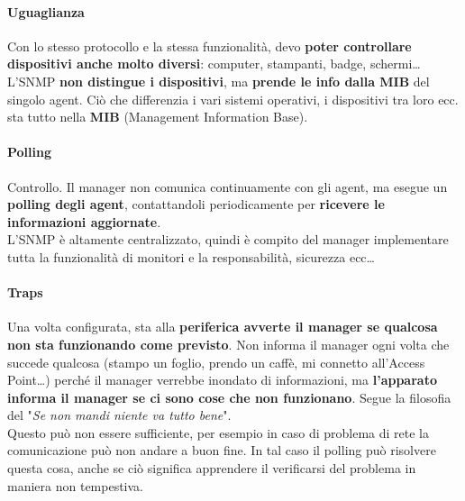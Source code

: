 \documentclass[10pt]{book}
\begin{document}
\paragraph{Uguaglianza} Con lo stesso protocollo e la stessa funzionalità, devo \textbf{poter controllare dispositivi anche molto diversi}: computer, stampanti, badge, schermi\ldots\\
L'SNMP \textbf{non distingue i dispositivi}, ma \textbf{prende le info dalla MIB} del singolo agent. Ciò che differenzia i vari sistemi operativi, i dispositivi tra loro ecc. sta tutto nella \textbf{MIB} (Management Information Base).
\paragraph{Polling} Controllo. Il manager non comunica continuamente con gli agent, ma esegue un \textbf{polling degli agent}, contattandoli periodicamente per \textbf{ricevere le informazioni aggiornate}.\\
L'SNMP è altamente centralizzato, quindi è compito del manager implementare tutta la funzionalità di monitori e la responsabilità, sicurezza ecc\ldots
\paragraph{Traps} Una volta configurata, sta alla \textbf{periferica avverte il manager se qualcosa non sta funzionando come previsto}. Non informa il manager ogni volta che succede qualcosa (stampo un foglio, prendo un caffè, mi connetto all'Access Point\ldots) perché il manager verrebbe inondato di informazioni, ma \textbf{l'apparato informa il manager se ci sono cose che non funzionano}. Segue la filosofia del "\textit{Se non mandi niente va tutto bene}".\\
Questo può non essere sufficiente, per esempio in caso di problema di rete la comunicazione può non andare a buon fine. In tal caso il polling può risolvere questa cosa, anche se ciò significa apprendere il verificarsi del problema in maniera non tempestiva.
\end{document}
